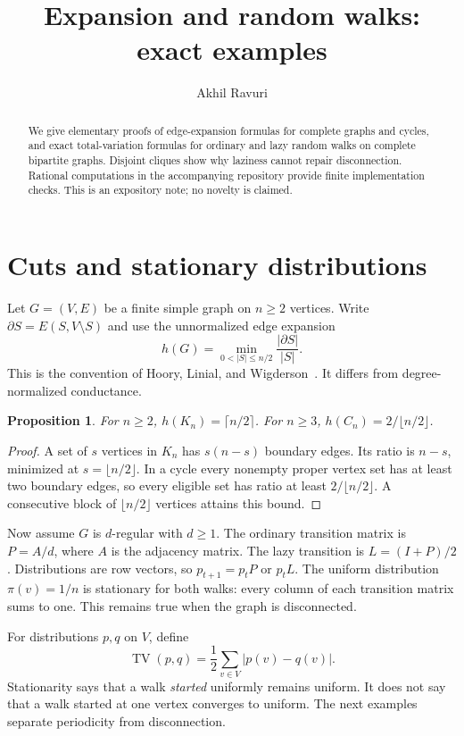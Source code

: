 \documentclass[11pt,letterpaper]{article}
\title{\vspace{-1.5em}\LARGE\bfseries Expansion and random walks:\\ exact examples}
\author{Akhil Ravuri}\date{}
\newtheorem{proposition}{Proposition}
\newcommand{\TV}{\operatorname{TV}}
\begin{document}
\maketitle\vspace{-1.5em}
\begin{abstract}
We give elementary proofs of edge-expansion formulas for complete graphs and
cycles, and exact total-variation formulas for ordinary and lazy random walks
on complete bipartite graphs. Disjoint cliques show why laziness cannot repair
disconnection. Rational computations in the accompanying repository provide
finite implementation checks. This is an expository note; no novelty is claimed.
\end{abstract}

\section{Cuts and stationary distributions}
Let $G=(V,E)$ be a finite simple graph on $n\ge2$ vertices. Write
$\partial S=E(S,V\setminus S)$ and use the unnormalized edge expansion
\[
 h(G)=\min_{0<|S|\le n/2}\frac{|\partial S|}{|S|}.
\]
This is the convention of Hoory, Linial, and Wigderson~\cite[Definition 2.1]{HLW}.
It differs from degree-normalized conductance.

\begin{proposition}\label{prop:cuts}
For $n\ge2$, $h(K_n)=\lceil n/2\rceil$. For $n\ge3$,
$h(C_n)=2/\lfloor n/2\rfloor$.
\end{proposition}
\begin{proof}
A set of $s$ vertices in $K_n$ has $s(n-s)$ boundary edges. Its ratio is
$n-s$, minimized at $s=\lfloor n/2\rfloor$. In a cycle every nonempty proper
vertex set has at least two boundary edges, so every eligible set has ratio
at least $2/\lfloor n/2\rfloor$. A consecutive block of
$\lfloor n/2\rfloor$ vertices attains this bound.
\end{proof}

Now assume $G$ is $d$-regular with $d\ge1$. The ordinary transition matrix is
$P=A/d$, where $A$ is the adjacency matrix. The lazy transition is
$L=(I+P)/2$. Distributions are row vectors, so $p_{t+1}=p_tP$ or $p_tL$.
The uniform distribution $\pi(v)=1/n$ is stationary for both walks: every
column of each transition matrix sums to one. This remains true when the
graph is disconnected.

For distributions $p,q$ on $V$, define
\[
 \TV(p,q)=\frac12\sum_{v\in V}|p(v)-q(v)|.
\]
Stationarity says that a walk \emph{started} uniformly remains uniform.
It does not say that a walk started at one vertex converges to uniform.
The next examples separate periodicity from disconnection.
\end{document}
